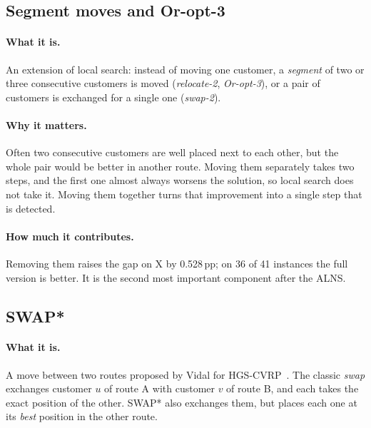 \documentclass[11pt,a4paper]{article}
\newcommand{\pp}{\,pp}
\begin{document}
\subsection{Segment moves and Or-opt-3}
\label{sec:segmentos}

\paragraph{What it is.} An extension of local search: instead of moving one customer, a
\emph{segment} of two or three consecutive customers is moved (\emph{relocate-2}, \emph{Or-opt-3}),
or a pair of customers is exchanged for a single one (\emph{swap-2}).

\paragraph{Why it matters.} Often two consecutive customers are well placed next to each other, but
the whole pair would be better in another route. Moving them separately takes two steps, and the
first one almost always worsens the solution, so local search does not take it. Moving them together
turns that improvement into a single step that is detected.

\paragraph{How much it contributes.} Removing them raises the gap on X by 0.528\pp{}; on 36 of 41
instances the full version is better. It is the second most important component after the ALNS.

\subsection{SWAP*}
\label{sec:swapstar}

\paragraph{What it is.} A move between two routes proposed by Vidal for
HGS-CVRP~\cite{vidal2022hgs}. The classic \emph{swap} exchanges customer $u$ of route A with customer
$v$ of route B, and each takes the exact position of the other. SWAP* also exchanges them, but places
each one at its \emph{best} position in the other route.
\end{document}
